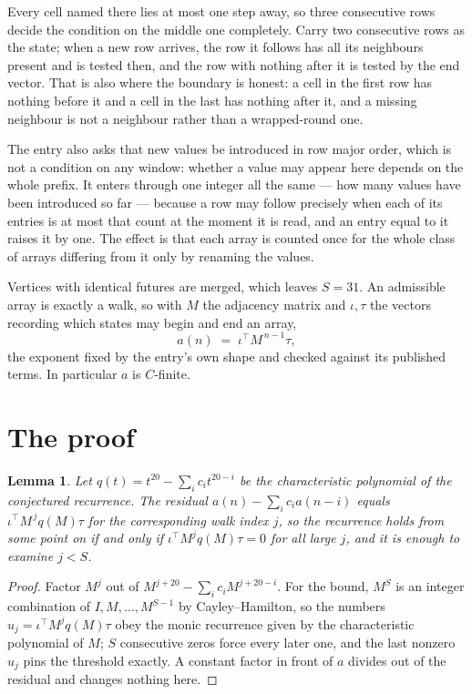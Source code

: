 \documentclass[11pt,a4paper]{article}
\theoremstyle{plain}
\newtheorem{lemma}[theorem]{Lemma}
\theoremstyle{definition}
\begin{document}
Every cell named there lies at most one step away, so three consecutive rows decide the condition on the middle one completely. Carry two consecutive rows as the state; when a new row arrives, the row it follows has all its neighbours present and is tested then, and the row with nothing after it is tested by the end vector. That is also where the boundary is honest: a cell in the first row has nothing before it and a cell in the last has nothing after it, and a missing neighbour is not a neighbour rather than a wrapped-round one.

The entry also asks that new values be introduced in row major order, which is not a condition on any window: whether a value may appear here depends on the whole prefix. It enters through one integer all the same --- how many values have been introduced so far --- because a row may follow precisely when each of its entries is at most that count at the moment it is read, and an entry equal to it raises it by one. The effect is that each array is counted once for the whole class of arrays differing from it only by renaming the values.

Vertices with identical futures are merged, which leaves $S=31$. An admissible array is exactly a walk, so with $M$ the adjacency matrix and $\iota,\tau$ the vectors recording which states may begin and end an array,
\[
a(n)\;=\;\iota^{\!\top}M^{\,n-1}\tau ,
\]
the exponent fixed by the entry's own shape and checked against its published terms. In
particular $a$ is $C$-finite.

\section{The proof}

\begin{lemma}\label{lem:crit}
Let $q(t)=t^{20}-\sum_i c_it^{20-i}$ be the characteristic polynomial of the
conjectured recurrence. The residual $a(n)-\sum_ic_ia(n-i)$ equals
$\iota^{\!\top}M^{\,j}q(M)\tau$ for the corresponding walk index $j$, so the recurrence
holds from some point on if and only if $\iota^{\!\top}M^{j}q(M)\tau=0$ for all large $j$,
and it is enough to examine $j<S$.
\end{lemma}

\begin{proof}
Factor $M^{j}$ out of $M^{j+20}-\sum_ic_iM^{j+20-i}$. For the bound, $M^{S}$
is an integer combination of $I,M,\dots,M^{S-1}$ by Cayley--Hamilton, so the numbers
$u_j=\iota^{\!\top}M^{j}q(M)\tau$ obey the monic recurrence given by the characteristic
polynomial of $M$; $S$ consecutive zeros force every later one, and the last nonzero $u_j$
pins the threshold exactly. A constant factor in front of $a$ divides out of the residual and
changes nothing here.
\end{proof}
\end{document}
